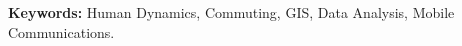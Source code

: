 \documentclass[a4paper,11pt]{article}
\begin{document}
{\bf Keywords:} Human Dynamics, Commuting, GIS, Data Analysis, Mobile Communications.
 


\newpage
\tableofcontents %
\listoffigures	%

\newpage
\setcounter{secnumdepth}{0}












\newpage


\end{document}

